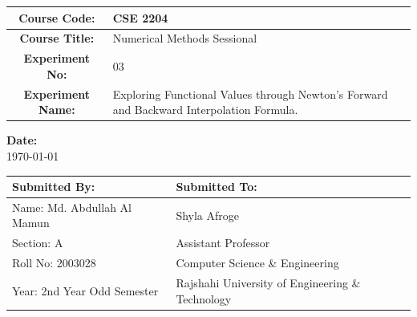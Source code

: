 \documentclass[a4paper,12pt]{report}
\begin{document}
\begin{titlepage}
\begin{center}
        \begin{table}[h]
            \centering
            \begin{tabularx}{0.7\paperwidth}{|c|X|}
                \hline
                \textbf{Course Code:}     & CSE 2204                                                                                 \\
                \hline
                \textbf{Course Title:}    & Numerical Methods Sessional                                                              \\
                \hline
                \textbf{Experiment No:}   & 03                                                                                       \\
                \hline
                \textbf{Experiment Name:} & Exploring Functional Values through Newton's Forward and Backward Interpolation Formula. \\
                \hline
            \end{tabularx}
        \end{table}

        \vspace{0.5in}
        \textbf{Date:} \\
        \today

        \vfill

        \begin{table}[h]
            \centering
            \begin{tabularx}{0.7\paperwidth}{|X|X|}
                \hline
                Submitted By:               & Submitted To:                                    \\
                \hline
                Name: Md. Abdullah Al Mamun & Shyla Afroge                                     \\
                \hline
                Section: A                  & Assistant Professor                              \\
                \hline
                Roll No: 2003028            & Computer Science \& Engineering                  \\
                \hline
                Year: 2nd Year Odd Semester & Rajshahi University of Engineering \& Technology \\
                \hline
            \end{tabularx}
        \end{table}
    \end{center}
\end{titlepage}
\end{document}
